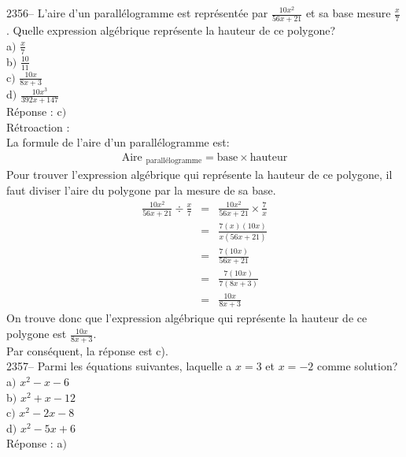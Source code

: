 \documentclass[letterpaper, 12pt]{article}
\begin{document}
2356-- L'aire d'un parall\'elogramme est repr\'esent\'ee par $\frac{10x^{2}}{56x+21}$ et sa base mesure $\frac{x}{7}$. Quelle expression alg\'ebrique repr\'esente la hauteur de ce polygone?\\

a$)$ $\frac{x}{7}$\\[2mm]
b$)$ $\frac{10}{11}$\\[2mm]
c$)$ $\frac{10x}{8x+3}$\\[2mm]
d$)$ $\frac{10x^{3}}{392x+147}$\\

R\'eponse : c$)$\\

R\'etroaction :\\
La formule de l'aire d'un parall\'elogramme est:
\begin{eqnarray*}
 \textrm{Aire $_{\textrm{parall\'elogramme}}$}=\textrm{base}\times\textrm{hauteur}
\end{eqnarray*}
Pour trouver l'expression alg\'ebrique qui repr\'esente la hauteur de ce polygone, il faut diviser l'aire du polygone par la mesure de sa base.
\begin{eqnarray*}
 \frac{10x^{2}}{56x+21}\div \frac{x}{7}&=&  \frac{10x^{2}}{56x+21} \times \frac{7}{x}\\[2mm]
&=&  \frac{7(x)(10x)}{x(56x+21)}\\[2mm]
&=&  \frac{7(10x)}{56x+21}\\[2mm]
&=&  \frac{7(10x)}{7(8x+3)}\\[2mm]
&=&  \frac{10x}{8x+3}
\end{eqnarray*}
On trouve donc que l'expression alg\'ebrique qui repr\'esente la hauteur de ce polygone est $\frac{10x}{8x+3}$.\\
Par cons\'equent, la r\'eponse est c).\\

2357-- Parmi les \'equations suivantes, laquelle a $x=3$ et $x=-2$ comme solution?\\

a$)$ $x^{2}-x-6$\\
b$)$ $x^{2}+x-12$\\
c$)$ $x^{2}-2x-8$\\
d$)$ $x^{2}-5x+6$\\

R\'eponse : a$)$\\
\end{document}
